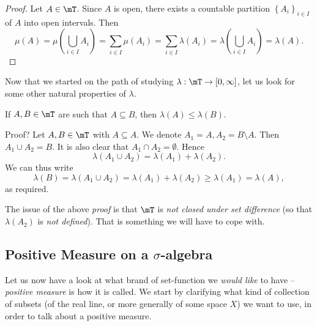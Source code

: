 \documentclass[pmath450]{subfiles}
\begin{document}
    \begin{proof}
        Let $A\in\mT$. Since $A$ is open, there exists a countable partition $\left\lbrace A_i \right\rbrace^{}_{i\in I}$ of $A$ into open intervals. Then
        \begin{equation*}
            \mu\left( A \right) = \mu\left( \bigcup^{}_{i\in I}A_i \right) = \sum^{}_{i\in I}\mu\left( A_i \right) = \sum^{}_{i\in I}\lambda\left( A_i \right) = \lambda\left( \bigcup^{}_{i\in I}A_i \right) = \lambda\left( A \right).
        \end{equation*}
    \end{proof}

    \np Now that we started on the path of studying $\lambda:\mT\to\left[ 0,\infty \right]$, let us look for some other natural properties of $\lambda$.

    \begin{prop}{}
        If $A,B\in\mT$ are such that $A\subseteq B$, then $\lambda\left( A \right)\leq\lambda\left( B \right)$.
    \end{prop}

    \begin{pf}{\pffont Proof?}{\placeqed[???]}
        Let $A,B\in\mT$ with $A\subseteq A$. We denote $A_1=A, A_2=B\setminus A$. Then $A_1\cup A_2=B$. It is also clear that $A_1\cap A_2=\emptyset$. Hence
        \begin{equation*}
            \lambda\left( A_1\cup A_2 \right)=\lambda\left( A_1 \right)+\lambda\left( A_2 \right).
        \end{equation*}
        We can thus write
        \begin{equation*}
            \lambda\left( B \right) = \lambda\left( A_1\cup A_2 \right) = \lambda\left( A_1 \right)+\lambda\left( A_2 \right) \geq \lambda\left( A_1 \right)=\lambda\left( A \right),
        \end{equation*}
        as required.
    \end{pf}

    \np The issue of the above \textit{proof} is that $\mT$ is \textit{not closed under set difference} (so that $\lambda\left( A_2 \right)$ is \textit{not defined}). That is something we will have to cope with.

    \subsection{Positive Measure on a $\sigma$-algebra}
    
    Let us now have a look at what brand of set-function we \textit{would like} to have -- \textit{positive measure} is how it is called. We start by clarifying what kind of collection of subsets (of the real line, or more generally of some space $X$) we want to use, in order to talk about a positive measure.
\end{document}
